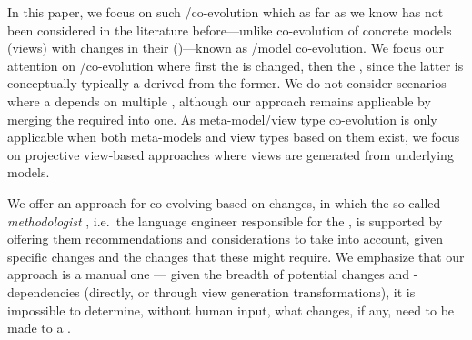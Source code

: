 In this paper, we focus on such \metamodel/\viewtype co-evolution which as far as we know has not been considered in the literature before---unlike co-evolution of concrete models (views) with changes in their \metamodel (\viewtype)---known as \metamodel/model co-evolution.
We focus our attention on \metamodel/\viewtype co-evolution where first the \metamodel is changed, then the \viewtype, since the latter is conceptually typically a \metamodel derived from the former. %
We do not consider scenarios where a \viewtype depends on multiple \metamodels, although our approach remains applicable by merging the required \metamodels into one. %
As meta-model/view type co-evolution is only applicable when both meta-models and view types based on them exist, we focus on projective view-based approaches \cite{atkinson_fundamental_2015} where views are generated from underlying models.

We offer an approach for co-evolving \viewtypes based on \metamodel changes, in which the so-called \textit{methodologist} \cite{atkinson_orthographic_2010}, i.e.~the language engineer responsible for the \viewtype, is supported by offering them recommendations and considerations to take into account, given specific \metamodel changes and the \viewtype changes that these might require. We emphasize that our approach is a manual one --- given the breadth of potential \metamodel changes and \viewtypes-\metamodel dependencies (directly, or through view generation transformations), it is impossible to determine, without human input, what changes, if any, need to be made to a \viewtype.

